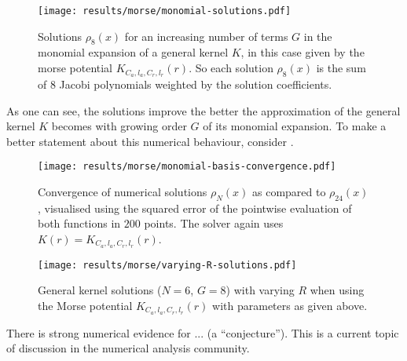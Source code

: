 \begin{figure}[H]
  \centering
  \label{fig:monomial-solutions}
  \texttt{[image: results/morse/monomial-solutions.pdf]}
  \caption[]{Solutions $\rho_8(x)$ for an increasing number of terms $G$ in the monomial expansion of a general kernel $K$, in this case given by the morse potential $K_{C_a, l_a, C_r, l_r}(r)$. So each solution $\rho_8(x)$ is the sum of $8$ Jacobi polynomials weighted by the solution coefficients.}
\end{figure}

As one can see, the solutions improve the better the approximation of the general kernel $K$ becomes with growing order $G$ of its monomial expansion.
To make a better statement about this numerical behaviour, consider .

\begin{figure}[H]
  \centering
  \label{fig:monomial-basis-convergence}
  \texttt{[image: results/morse/monomial-basis-convergence.pdf]}
  \caption[Step-by-step convergence of solutions when increasing the degree of the monomial]{
    Convergence of numerical solutions $\rho_N(x)$ as compared to $\rho_{24}(x)$, visualised using the squared error of the pointwise evaluation of both functions in $200$ points.
    The solver again uses $K(r) = K_{C_a, l_a, C_r, l_r}(r)$.
  }
\end{figure}

\begin{figure}[H]
  \centering
  \label{fig:varying-R-solutions}
  \texttt{[image: results/morse/varying-R-solutions.pdf]}
  \caption[Solutions with varying $R$]{General kernel solutions ($N = 6$, $G = 8$) with varying $R$ when using the Morse potential $K_{C_a, l_a, C_r, l_r}(r)$ with parameters as given above.}
\end{figure}

There is strong numerical evidence for ... (a ``conjecture'').
This is a current topic of discussion in the numerical analysis community.
